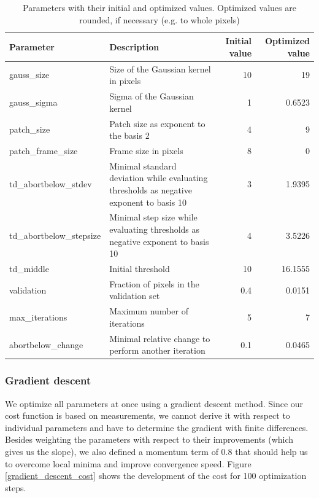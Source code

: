 \documentclass[10pt,conference,compsocconf]{IEEEtran}
\begin{document}
\begin{table}
\begin{center}
\begin{tabular}{|l|p{6cm}|r|r|}
\hline
Parameter & Description & Initial value & Optimized value\\
\hline
gauss\_size & Size of the Gaussian kernel in pixels & 10 & 19 \\
gauss\_sigma & Sigma of the Gaussian kernel & 1 & 0.6523 \\
patch\_size & Patch size as exponent to the basis 2 & 4 & 9 \\
patch\_frame\_size & Frame size in pixels & 8 & 0 \\
td\_abortbelow\_stdev & Minimal standard deviation while evaluating thresholds as negative exponent to basis 10& 3 & 1.9395 \\
td\_abortbelow\_stepsize & Minimal step size while evaluating thresholds as negative exponent to basis 10& 4 & 3.5226 \\
td\_middle & Initial threshold & 10 & 16.1555 \\
validation & Fraction of pixels in the validation set & 0.4 & 0.0151 \\
max\_iterations & Maximum number of iterations & 5 & 7 \\
abortbelow\_change & Minimal relative change to perform another iteration & 0.1 & 0.0465 \\
\hline
\end{tabular}
\end{center}
\caption{Parameters with their initial and optimized values. Optimized values are rounded, if necessary (e.g. to whole pixels)}
\label{parameters}
\end{table}

\subsubsection{Gradient descent}
\label{gradient_descent}
We optimize all parameters at once using a gradient descent method. Since our cost function is based on measurements, we cannot derive it with respect to individual parameters and have to determine the gradient with finite differences. Besides weighting the parameters with respect to their improvements (which gives us the slope), we also defined a momentum term of 0.8 that should help us to overcome local minima and improve convergence speed. Figure \ref{gradient_descent_cost} shows the development of the cost for 100 optimization steps.
\end{document}
